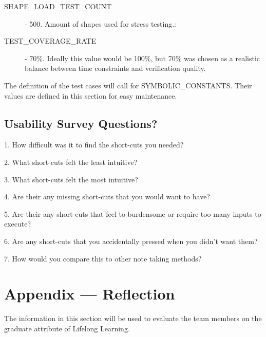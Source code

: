 \documentclass[12pt, titlepage]{article}
\begin{document}
\begin{description}
  \item[SHAPE\_LOAD\_TEST\_COUNT] - 500.  Amount of shapes used for stress testing.: 
\end{description}

\begin{description}
  \item[TEST\_COVERAGE\_RATE] - 70\%. Ideally this value would be 100\%, but 70\% was chosen as a realistic balance between time constraints and verification quality.
\end{description}

The definition of the test cases will call for SYMBOLIC\_CONSTANTS.
Their values are defined in this section for easy maintenance.\\


\subsection{Usability Survey Questions?}


1. How difficult was it to find the short-cuts you needed?

2. What short-cuts felt the least intuitive? 

3. What short-cuts felt the most intuitive? 

4. Are their any missing short-cuts that you would want to have?

5. Are their any short-cuts that feel to burdensome or require too many inputs to execute?

6. Are any short-cuts that you accidentally pressed when you didn't want them?

7. How would you compare this to other note taking methods?

\newpage{}
\section*{Appendix --- Reflection}


The information in this section will be used to evaluate the team members on the
graduate attribute of Lifelong Learning.


\end{document}
